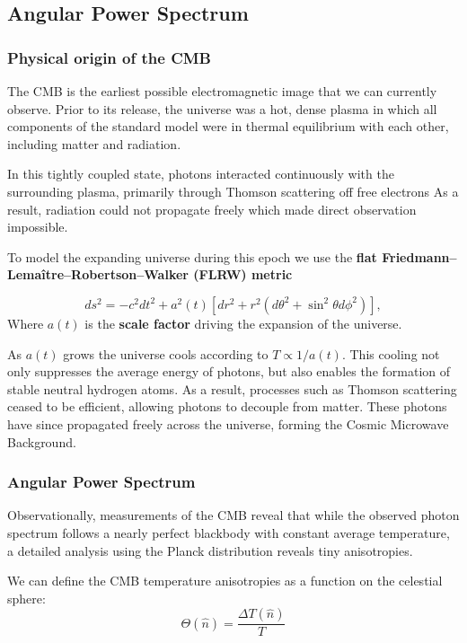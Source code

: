 \documentclass[11pt,a4paper]{article}
\numberwithin{equation}{section}
\begin{document}
\subsection{Angular Power Spectrum}
\label{sec:aps}

\subsubsection{Physical origin of the CMB}

The CMB is the earliest possible electromagnetic image that we can currently observe. 
Prior to its release, the universe was a hot, dense plasma in which all components of the standard model were in thermal equilibrium with each other, including matter and radiation.  

In this tightly coupled state, photons interacted continuously with the surrounding plasma, primarily through Thomson scattering off free electrons
As a result, radiation could not propagate freely which made direct observation impossible.

To model the expanding universe during this epoch we use the \textbf{flat Friedmann–Lemaître–Robertson–Walker (FLRW) metric}

\begin{equation}
ds^2 = -c^2dt^2 + a^2(t)\left[dr^2 + r^2(d\theta^2 + \sin^2\theta d\phi^2) \right],
\end{equation}
Where $a(t)$ is the \textbf{scale factor} driving the expansion of the universe. 

As $a(t)$ grows the universe cools according to $T \propto 1/a(t)$. This cooling not only suppresses the average energy of photons, but also enables the formation of stable neutral hydrogen atoms. As a result, processes such as Thomson scattering ceased to be efficient, allowing photons to decouple from matter. These photons have since propagated freely across the universe, forming the Cosmic Microwave Background.
\subsubsection{Angular Power Spectrum}
Observationally, measurements of the CMB reveal that while the observed photon spectrum follows a nearly perfect blackbody with constant average temperature, a detailed analysis using the Planck distribution reveals tiny anisotropies. 

We can define the CMB temperature anisotropies as a function on the celestial sphere: 
\begin{equation}
  \Theta(\hat n) = \frac{\Delta T(\hat n)}{T}
\end{equation}
\end{document}
